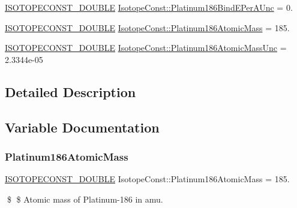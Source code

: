 \begin{DoxyCompactItemize}
\mbox{\hyperlink{group___isotope_const-_macros_ga8f45a7272ce02c0b4c65c44636ed719a}{I\+S\+O\+T\+O\+P\+E\+C\+O\+N\+S\+T\+\_\+\+D\+O\+U\+B\+LE}} \mbox{\hyperlink{group___isotope_const-_platinum-_pt186_ga6daa6e78b42c7084a5bb66745b2d0d58}{Isotope\+Const\+::\+Platinum186\+Bind\+E\+Per\+A\+Unc}} = 0.
\item 
\mbox{\hyperlink{group___isotope_const-_macros_ga8f45a7272ce02c0b4c65c44636ed719a}{I\+S\+O\+T\+O\+P\+E\+C\+O\+N\+S\+T\+\_\+\+D\+O\+U\+B\+LE}} \mbox{\hyperlink{group___isotope_const-_platinum-_pt186_ga88af8d99d09d921025ccb81377b4d20c}{Isotope\+Const\+::\+Platinum186\+Atomic\+Mass}} = 185.
\item 
\mbox{\hyperlink{group___isotope_const-_macros_ga8f45a7272ce02c0b4c65c44636ed719a}{I\+S\+O\+T\+O\+P\+E\+C\+O\+N\+S\+T\+\_\+\+D\+O\+U\+B\+LE}} \mbox{\hyperlink{group___isotope_const-_platinum-_pt186_ga0d6e5c4d3ae2eda5a58427faf75e6491}{Isotope\+Const\+::\+Platinum186\+Atomic\+Mass\+Unc}} = 2.\+3344e-\/05
\end{DoxyCompactItemize}


\subsection{Detailed Description}


\subsection{Variable Documentation}
\mbox{\label{group___isotope_const-_platinum-_pt186_ga88af8d99d09d921025ccb81377b4d20c}} 
\subsubsection{\texorpdfstring{Platinum186\+Atomic\+Mass}{Platinum186AtomicMass}}
{\footnotesize\ttfamily \mbox{\hyperlink{group___isotope_const-_macros_ga8f45a7272ce02c0b4c65c44636ed719a}{I\+S\+O\+T\+O\+P\+E\+C\+O\+N\+S\+T\+\_\+\+D\+O\+U\+B\+LE}} Isotope\+Const\+::\+Platinum186\+Atomic\+Mass = 185.}

\$ \$ Atomic mass of Platinum-\/186 in amu. \mbox{\label{group___isotope_const-_platinum-_pt186_ga0d6e5c4d3ae2eda5a58427faf75e6491}} 
